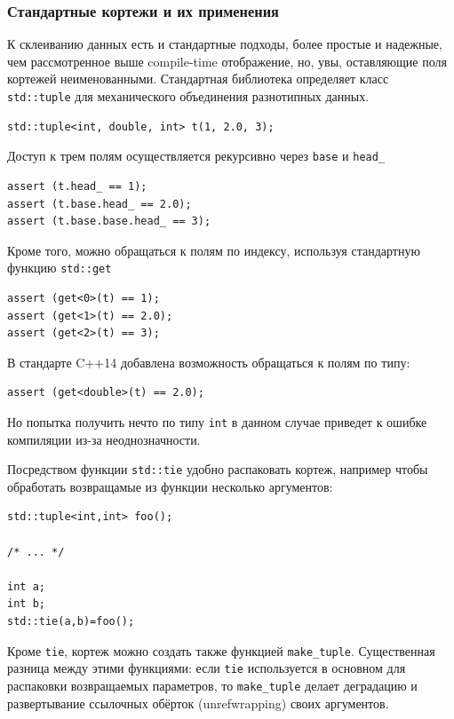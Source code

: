 \documentclass[a4paper,12pt,oneside]{article}
\begin{document}
\subsubsection{Стандартные кортежи и их применения}\label{StdTuples}

К склеиванию данных есть и стандартные подходы, более простые и надежные, чем рассмотренное выше compile-time отображение, но, увы, оставляющие поля кортежей неименованными. Стандартная библиотека определяет класс \lstinline!std::tuple! для механического объединения разнотипных данных.

\begin{lstlisting}
std::tuple<int, double, int> t(1, 2.0, 3);
\end{lstlisting}

Доступ к трем полям осуществляется рекурсивно через \lstinline!base! и \lstinline!head_!

\begin{lstlisting}
assert (t.head_ == 1);
assert (t.base.head_ == 2.0);
assert (t.base.base.head_ == 3);
\end{lstlisting}

Кроме того, можно обращаться к полям по индексу, используя стандартную функцию \lstinline!std::get!

\begin{lstlisting}
assert (get<0>(t) == 1);
assert (get<1>(t) == 2.0);
assert (get<2>(t) == 3);
\end{lstlisting}

В стандарте C++14 добавлена возможность обращаться к полям по типу:

\begin{lstlisting}
assert (get<double>(t) == 2.0);
\end{lstlisting}

Но попытка получить нечто по типу \lstinline!int! в данном случае приведет к ошибке компиляции из-за неоднозначности.

Посредством функции \lstinline!std::tie! удобно распаковать кортеж, например чтобы обработать возвращамые из функции несколько аргументов:

\begin{lstlisting}
std::tuple<int,int> foo();

/* ... */

int a;
int b;
std::tie(a,b)=foo();
\end{lstlisting}

Кроме \lstinline!tie!, кортеж можно создать также функцией \lstinline!make_tuple!. Существенная разница между этими функциями: если \lstinline!tie! используется в основном для распаковки возвращаемых параметров, то \lstinline!make_tuple! делает деградацию и развертывание ссылочных обёрток (unrefwrapping) своих аргументов.
\end{document}
